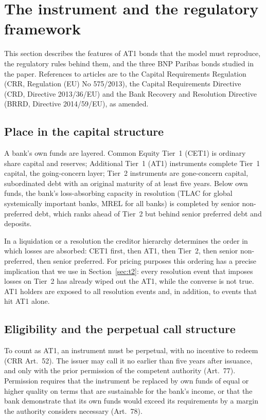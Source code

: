 \section{The instrument and the regulatory framework}\label{sec:institutions}

This section describes the features of AT1 bonds that the model must reproduce, the
regulatory rules behind them, and the three BNP Paribas bonds studied in the paper.
References to articles are to the Capital Requirements Regulation (CRR, Regulation (EU)
No 575/2013), the Capital Requirements Directive (CRD, Directive 2013/36/EU) and the
Bank Recovery and Resolution Directive (BRRD, Directive 2014/59/EU), as amended.

\subsection{Place in the capital structure}

A bank's own funds are layered. Common Equity Tier~1 (CET1) is ordinary share capital
and reserves; Additional Tier~1 (AT1) instruments complete Tier~1 capital, the
going-concern layer; Tier~2 instruments are gone-concern capital, subordinated debt
with an original maturity of at least five years. Below own funds, the bank's
loss-absorbing capacity in resolution (TLAC for global systemically important banks,
MREL for all banks) is completed by senior non-preferred debt, which ranks ahead of
Tier~2 but behind senior preferred debt and deposits.

In a liquidation or a resolution the creditor hierarchy determines the order in which
losses are absorbed: CET1 first, then AT1, then Tier~2, then senior non-preferred, then
senior preferred. For pricing purposes this ordering has a precise implication that we
use in Section~\ref{sec:t2}: every resolution event that imposes losses on Tier~2 has
already wiped out the AT1, while the converse is not true. AT1 holders are exposed to
all resolution events and, in addition, to events that hit AT1 alone.

\subsection{Eligibility and the perpetual call structure}

To count as AT1, an instrument must be perpetual, with no incentive to redeem (CRR
Art.~52). The issuer may call it no earlier than five years after issuance, and only
with the prior permission of the competent authority (Art.~77). Permission requires
that the instrument be replaced by own funds of equal or higher quality on terms that
are sustainable for the bank's income, or that the bank demonstrate that its own funds
would exceed its requirements by a margin the authority considers necessary (Art.~78).

